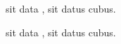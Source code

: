 \documentclass[12pt]{book}
\begin{document}
\htmlcut[inizio]
\par
sit data , sit datus cubus.
\par
sit data , sit datus cubus.
\par
\end{document}
